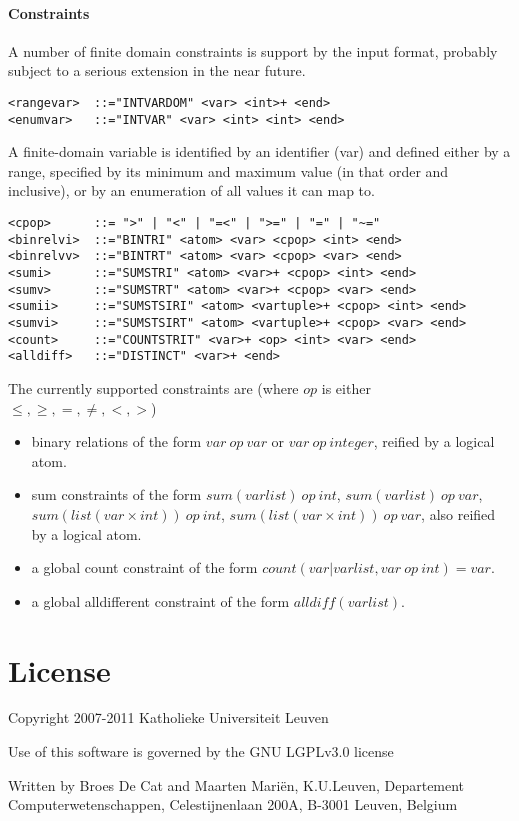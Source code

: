 \documentclass{article}
\begin{document}
\paragraph{Constraints}
A number of finite domain constraints is support by the input format, probably subject to a serious extension in the near future.

\begin{verbatim}
<rangevar>  ::="INTVARDOM" <var> <int>+ <end>
<enumvar>   ::="INTVAR" <var> <int> <int> <end>
\end{verbatim} 

A finite-domain variable is identified by an identifier (var) and defined either by a range, specified by its minimum and maximum value (in that order and inclusive), or by an enumeration of all values it can map to.

\begin{verbatim}
<cpop>      ::= ">" | "<" | "=<" | ">=" | "=" | "~="
<binrelvi>  ::="BINTRI"	<atom> <var> <cpop> <int> <end>
<binrelvv>  ::="BINTRT"	<atom> <var> <cpop> <var> <end>
<sumi>      ::="SUMSTRI" <atom> <var>+ <cpop> <int> <end>
<sumv>      ::="SUMSTRT" <atom> <var>+ <cpop> <var> <end>
<sumii>     ::="SUMSTSIRI" <atom> <vartuple>+ <cpop> <int> <end>
<sumvi>     ::="SUMSTSIRT" <atom> <vartuple>+ <cpop> <var> <end>
<count>     ::="COUNTSTRIT" <var>+ <op> <int> <var> <end>
<alldiff>   ::="DISTINCT" <var>+ <end>
\end{verbatim} 

The currently supported constraints are (where $op$ is either $\leq, \geq, =, \neq, <, >$)
\begin{itemize}
\item binary relations of the form $var~op~var$ or $var~op~integer$, reified by a logical atom.
\item sum constraints of the form $sum(varlist)~op~int$, $sum(varlist)~op~var$, $sum(list(var\times int))~op~int$, $sum(list(var \times int))~op~var$, also reified by a logical atom.
\item a global count constraint of the form $count({var | varlist, var~op~int}) = var$.
\item a global alldifferent constraint of the form $alldiff(varlist)$.
\end{itemize}

\section{License}
Copyright 2007-2011 Katholieke Universiteit Leuven

Use of this software is governed by the GNU LGPLv3.0 license

Written by Broes De Cat and Maarten Mariën, K.U.Leuven, Departement Computerwetenschappen, Celestijnenlaan 200A, B-3001 Leuven, Belgium
\end{document}
